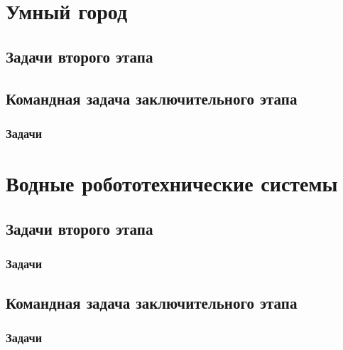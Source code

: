 \documentclass[a4paper,12pt,oneside]{book}
\begin{document}
\part{Умный город}
\clearpage
\chapter{Задачи второго этапа}

\clearpage
\chapter{Командная задача заключительного этапа}
\section{Задачи}


\part{Водные робототехнические системы}
\clearpage
\chapter{Задачи второго этапа}
\section{Задачи}

\clearpage
\chapter{Командная задача заключительного этапа}
\section{Задачи}

\end{document}
